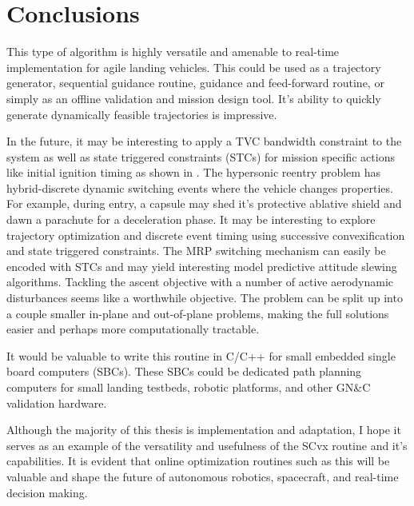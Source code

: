 \chapter{Conclusions}
\label{conclusions}


This type of algorithm is highly versatile and amenable to real-time implementation for agile landing vehicles. This could be used as a trajectory generator, sequential guidance routine, guidance and feed-forward routine, or simply as an offline validation and mission design tool. It's ability to quickly generate dynamically feasible trajectories is impressive.

In the future, it may be interesting to apply a TVC bandwidth constraint to the system as well as state triggered constraints (STCs) for mission specific actions like initial ignition timing as shown in \cite{szmuk2018successivestcs}. The hypersonic reentry problem has hybrid-discrete dynamic switching events where the vehicle changes properties. For example, during entry, a capsule may shed it's protective ablative shield and dawn a parachute for a deceleration phase. It may be interesting to explore trajectory optimization and discrete event timing using successive convexification and state triggered constraints. The MRP switching mechanism can easily be encoded with STCs and may yield interesting model predictive attitude slewing algorithms. Tackling the ascent objective with a number of active aerodynamic disturbances seems like a worthwhile objective. The problem can be split up into a couple smaller in-plane and out-of-plane problems, making the full solutions easier and perhaps more computationally tractable.

It would be valuable to write this routine in C/C++ for small embedded single board computers (SBCs). These SBCs could be dedicated path planning computers for small landing testbeds, robotic platforms, and other GN\&C validation hardware.


Although the majority of this thesis is implementation and adaptation, I hope it serves as an example of the versatility and usefulness of the SCvx routine and it's capabilities. It is evident that online optimization routines such as this will be valuable and shape the future of autonomous robotics, spacecraft, and real-time decision making.